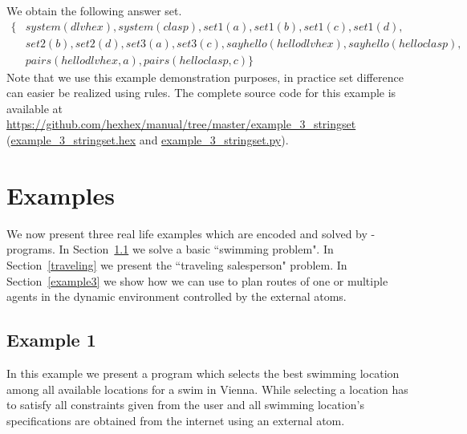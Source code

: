 \documentclass[a4paper, titlepage]{article}
\newcommand{\mi}[1]{\mathit{#1}}
\newcommand{\examplelink}[1]{\url{https://github.com/hexhex/manual/tree/master/#1}}
\newcommand{\exampledownloadlink}[2]{\href{https://github.com/hexhex/manual/raw/master/#1}{#2}}
\begin{document}
\begin{exmp}
\noindent
We obtain the following answer set.
\begin{align*}
  \{ & \mi{system(dlvhex),system(clasp),set1(a),set1(b),set1(c),set1(d),} \\
  & \mi{set2(b),set2(d),set3(a),set3(c),sayhello(hellodlvhex),sayhello(helloclasp),} \\
  & \mi{pairs(hellodlvhex,a),pairs(helloclasp,c)} \}
\end{align*}
%
Note that we use this example demonstration purposes,
in practice set difference can easier be realized using rules.
%
The complete source code for this example is available at
\examplelink{example_3_stringset}
(\exampledownloadlink{example_3_stringset/example_3_stringset.hex}{example\_3\_stringset.hex} and
\exampledownloadlink{example_3_stringset/example_3_stringset.py}{example\_3\_stringset.py}).
\end{exmp}

\section{Examples}
\label{sec:examples}
We now present three real life examples  
which are encoded and solved by \hex-programs. In Section~\ref{example1} we solve a basic ``swimming 
problem". In Section~\ref{traveling} we present the ``traveling salesperson" problem. In Section~\ref{example3} we show how we can use \dlvhex{} to plan routes of one or multiple agents in the dynamic 
environment controlled by the external atoms.

\subsection{Example 1}
\label{example1}
In this example we present a program which selects  
the best swimming location among all available locations 
for a swim in Vienna. While selecting a location has to 
satisfy all constraints given from the user and all swimming location's specifications are obtained from the internet using  
an external atom.
 
\end{document}
